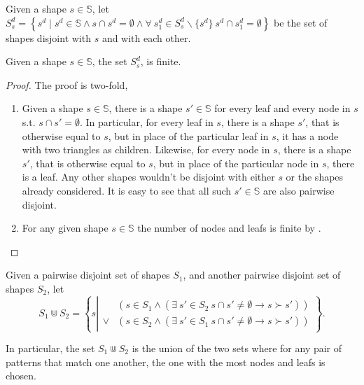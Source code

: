\begin{definition} Given a shape $s\in\mathbb{S}$, let $S^d_s= \left\{s^d \mid
s^d\in\mathbb{S} \wedge s\cap s^d=\emptyset \wedge \forall\ s^d_1\in
S^d_s\backslash\{s^d\}\ s^d\cap s^d_1=\emptyset \right\}$ be the set of shapes
disjoint with $s$ and with each other.\end{definition}

\begin{theorem}\label{lemma:extend-finite-converse} Given a shape
$s\in\mathbb{S}$, the set $S^d_s$, is finite.\end{theorem}

\begin{proof} The proof is two-fold,

\begin{enumerate}

\item Given a shape $s\in\mathbb{S}$, there is a shape $s'\in\mathbb{S}$ for
every leaf and every node in $s$ s.t. $s\cap s'=\emptyset$. In particular, for
every leaf in $s$, there is a shape $s'$, that is otherwise equal to $s$, but
in place of the particular leaf in $s$, it has a node with two triangles as
children.  Likewise, for every node in $s$, there is a shape $s'$, that is
otherwise equal to $s$, but in place of the particular node in $s$, there is a
leaf. Any other shapes wouldn't be disjoint with either $s$ or the shapes
already considered. It is easy to see that all such $s'\in\mathbb{S}$ are also
pairwise disjoint.

\item For any given shape $s\in\mathbb{S}$ the number of nodes and leafs is
finite by .\end{enumerate}\end{proof} 

\begin{definition} Given a pairwise disjoint set of shapes $S_1$, and another
pairwise disjoint set of shapes $S_2$, let $$S_1\Cup S_2 = \left\{ s \left|
\begin{array}{ll} &\left(s\in S_1 \wedge \left(\exists\ s'\in S_2\ s\cap
s'\neq\emptyset \longrightarrow s\succ s' \right) \right)\\ \vee & \left( s\in
S_2 \wedge \left(\exists\ s'\in S_1\ s\cap s'\neq\emptyset \longrightarrow
s\succ s' \right) \right) \end{array} \right.\right\}.$$\end{definition}

In particular, the set $S_1\Cup S_2$ is the union of the two sets where for any
pair of patterns that match one another, the one with the most nodes and leafs
is chosen. 

